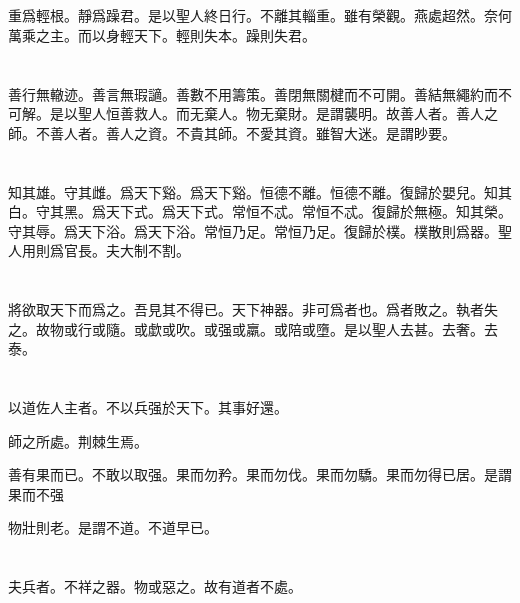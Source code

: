 \documentclass[a5paper]{ctexbook}
\begin{document}
    \chapter{}

    重爲輕根。靜爲躁君。是以聖人終日行。不離其輜重。雖有榮觀。燕處超然。奈何萬乘之主。而以身輕天下。輕則失本。躁則失君。

    \chapter{}

    善行無轍迹。善言無瑕讁。善數不用籌策。善閉無關楗而不可開。善結無繩約而不可解。是以聖人恒善救人。而无棄人。物无棄財。是謂襲明。故善人者。善人之師。不善人者。善人之資。不貴其師。不愛其資。雖智大迷。是謂眇要。

    \chapter{}

    知其雄。守其雌。爲天下谿。爲天下谿。恒德不離。恒德不離。復歸於嬰兒。知其白。守其黑。爲天下式。爲天下式。常恒不忒。常恒不忒。復歸於無極。知其榮。守其辱。爲天下浴。爲天下浴。常恒乃足。常恒乃足。復歸於樸。樸散則爲器。聖人用則爲官長。夫大制不割。

    \chapter{}

    將欲取天下而爲之。吾見其不得已。天下神器。非可爲者也。爲者敗之。執者失之。故物或行或隨。或歔或吹。或强或羸。或陪或墮。是以聖人去甚。去奢。去泰。

    \chapter{}

    以道佐人主者。不以兵强於天下。其事好還。
    
    師之所處。荆棘生焉。
    
    善有果而已。不敢以取强。果而勿矜。果而勿伐。果而勿驕。果而勿得已居。是謂果而不强

    物壯則老。是謂不道。不道早已。

    \chapter{}

    夫兵者。不祥之器。物或惡之。故有道者不處。
\end{document}
